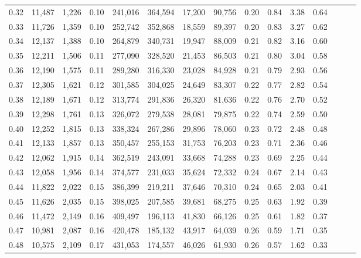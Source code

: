 \begin{tabular}{rrrrrrrrrrrrrrr}
0.32 &  11,487 &  1,226 &  0.10 &  241,016 &  364,594 &   17,200 &   90,756 &  0.20 &  0.84 &  3.38 &      0.64 \\
0.33 &  11,726 &  1,359 &  0.10 &  252,742 &  352,868 &   18,559 &   89,397 &  0.20 &  0.83 &  3.27 &      0.62 \\
0.34 &  12,137 &  1,388 &  0.10 &  264,879 &  340,731 &   19,947 &   88,009 &  0.21 &  0.82 &  3.16 &      0.60 \\
0.35 &  12,211 &  1,506 &  0.11 &  277,090 &  328,520 &   21,453 &   86,503 &  0.21 &  0.80 &  3.04 &      0.58 \\
0.36 &  12,190 &  1,575 &  0.11 &  289,280 &  316,330 &   23,028 &   84,928 &  0.21 &  0.79 &  2.93 &      0.56 \\
0.37 &  12,305 &  1,621 &  0.12 &  301,585 &  304,025 &   24,649 &   83,307 &  0.22 &  0.77 &  2.82 &      0.54 \\
0.38 &  12,189 &  1,671 &  0.12 &  313,774 &  291,836 &   26,320 &   81,636 &  0.22 &  0.76 &  2.70 &      0.52 \\
0.39 &  12,298 &  1,761 &  0.13 &  326,072 &  279,538 &   28,081 &   79,875 &  0.22 &  0.74 &  2.59 &      0.50 \\
0.40 &  12,252 &  1,815 &  0.13 &  338,324 &  267,286 &   29,896 &   78,060 &  0.23 &  0.72 &  2.48 &      0.48 \\
0.41 &  12,133 &  1,857 &  0.13 &  350,457 &  255,153 &   31,753 &   76,203 &  0.23 &  0.71 &  2.36 &      0.46 \\
0.42 &  12,062 &  1,915 &  0.14 &  362,519 &  243,091 &   33,668 &   74,288 &  0.23 &  0.69 &  2.25 &      0.44 \\
0.43 &  12,058 &  1,956 &  0.14 &  374,577 &  231,033 &   35,624 &   72,332 &  0.24 &  0.67 &  2.14 &      0.43 \\
0.44 &  11,822 &  2,022 &  0.15 &  386,399 &  219,211 &   37,646 &   70,310 &  0.24 &  0.65 &  2.03 &      0.41 \\
0.45 &  11,626 &  2,035 &  0.15 &  398,025 &  207,585 &   39,681 &   68,275 &  0.25 &  0.63 &  1.92 &      0.39 \\
0.46 &  11,472 &  2,149 &  0.16 &  409,497 &  196,113 &   41,830 &   66,126 &  0.25 &  0.61 &  1.82 &      0.37 \\
0.47 &  10,981 &  2,087 &  0.16 &  420,478 &  185,132 &   43,917 &   64,039 &  0.26 &  0.59 &  1.71 &      0.35 \\
0.48 &  10,575 &  2,109 &  0.17 &  431,053 &  174,557 &   46,026 &   61,930 &  0.26 &  0.57 &  1.62 &      0.33 \\

\end{tabular}

